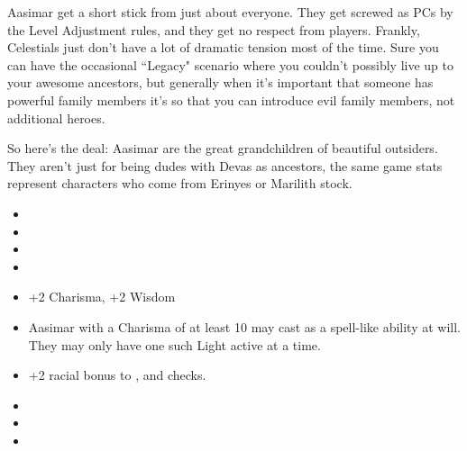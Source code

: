 
\vspace*{-8pt}

Aasimar get a short stick from just about everyone. They get screwed as PCs by the Level Adjustment rules, and they get no respect from players. Frankly, Celestials just don't have a lot of dramatic tension most of the time. Sure you can have the occasional ``Legacy" scenario where you couldn't possibly live up to your awesome ancestors, but generally when it's important that someone has powerful family members it's so that you can introduce evil family members, not additional heroes.

So here's the deal: Aasimar are the great grandchildren of beautiful outsiders. They aren't just for being dudes with Devas as ancestors, the same game stats represent characters who come from Erinyes or Marilith stock.

\begin{itemize}
\item {}
\item {}
\item {}
\item {}
\item +2 Charisma, +2 Wisdom
\item Aasimar with a Charisma of at least 10 may cast  as a spell-like ability at will. They may only have one such Light active at a time.
\item +2 racial bonus to , and  checks.
\item {}
\item {}
\item {}
\end{itemize}
